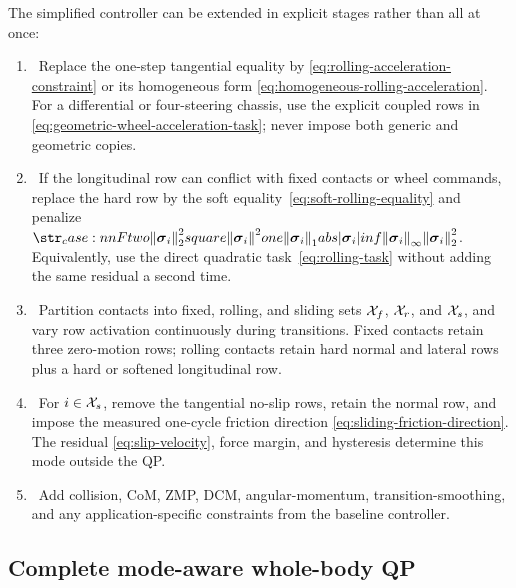 \documentclass[10pt]{article}
\newcommand{\slackVariable}{\bs{\sigma}}
\begin{document}
The simplified controller can be extended in explicit stages rather than all
at once:
\begin{enumerate}
  \item {}\ Replace the
    one-step tangential equality by
    \eqref{eq:rolling-acceleration-constraint} or its homogeneous form
    \eqref{eq:homogeneous-rolling-acceleration}. For a differential or
    four-steering chassis, use the explicit coupled rows in
    \eqref{eq:geometric-wheel-acceleration-task}; never impose both generic
    and geometric copies.
  \item {}\ If the longitudinal row can conflict
    with fixed contacts or wheel commands, replace the hard row by the soft
    equality~\eqref{eq:soft-rolling-equality} and penalize
    $\norm{\slackVariable_i}_2^2$. Equivalently, use the direct quadratic
    task~\eqref{eq:rolling-task} without adding the same residual a second
    time.
  \item {}\ Partition contacts
    into fixed, rolling, and sliding sets $\mathcal{X}_{f}$, $\mathcal{X}_{r}$, and
    $\mathcal{X}_{s}$, and vary row activation continuously during transitions.
    Fixed contacts retain three zero-motion rows; rolling contacts retain
    hard normal and lateral rows plus a hard or softened longitudinal row.
  \item {}\ For $i\in\mathcal{X}_{s}$,
    remove the tangential no-slip rows, retain the normal row, and impose the
    measured one-cycle friction direction
    \eqref{eq:sliding-friction-direction}. The residual
    \eqref{eq:slip-velocity}, force margin, and hysteresis determine this
    mode outside the QP.
  \item {}\ Add collision,
    CoM, ZMP, DCM, angular-momentum, transition-smoothing, and any
    application-specific constraints from the baseline controller.
\end{enumerate}

\subsection{Complete mode-aware whole-body QP}
\end{document}
